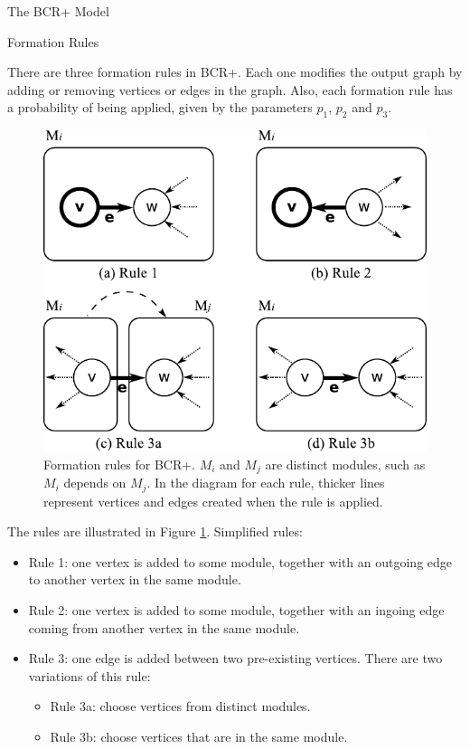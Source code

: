 \documentclass[11pt,twocolumn,a4paper,english]{article}
\begin{document}
\begin{section}{The BCR+ Model}
\begin{subsection}{Formation Rules}
	
	There are three formation rules in BCR+. Each one modifies the output graph by adding or removing vertices or edges in the graph. Also, each formation rule has a probability of being applied, given by the parameters $p_1$, $p_2$ and $p_3$.

\begin{figure}[htbp]
	\centering
		\includegraphics[scale=1]{figures/bcr-rules}
	\caption{Formation rules for BCR+. $M_i$ and $M_j$ are distinct modules, such as $M_i$ depends on $M_j$. In the diagram for each rule, thicker lines represent vertices and edges created when the rule is applied.}
	\label{fig:bcr-rules}
\end{figure}

	The rules are illustrated in Figure \ref{fig:bcr-rules}. Simplified rules:
	
	\begin{itemize}
		\item Rule 1: one vertex is added to some module, together with an outgoing edge to another vertex in the same module.
		\item Rule 2: one vertex is added to some module, together with an ingoing edge coming from another vertex in the same module.
		\item Rule 3: one edge is added between two pre-existing vertices. There are two variations of this rule:
		\begin{itemize}
			\item Rule 3a: choose vertices from distinct modules.
			\item Rule 3b: choose vertices that are in the same module.
		\end{itemize}
	\end{itemize}
	

\end{subsection}
\end{section}
\end{document}
